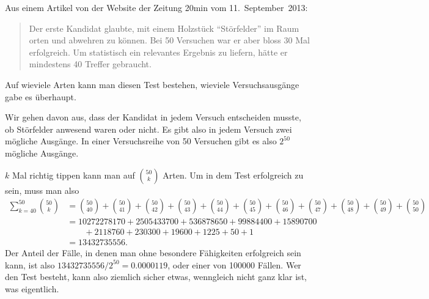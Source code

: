Aus einem Artikel von der Website der Zeitung 20min vom 11.~September~2013:
\begin{quotation}
Der erste Kandidat glaubte, mit einem Holzstück ``Störfelder'' im Raum
orten und abwehren zu können.
Bei 50 Versuchen war er aber bloss 30 Mal erfolgreich. Um statistisch
ein relevantes Ergebnis zu liefern, hätte er mindestens 40 Treffer gebraucht.
\end{quotation}
Auf wieviele Arten kann man diesen Test bestehen, wieviele Versuchsausgänge
gabe es überhaupt.


\begin{loesung}
Wir gehen davon aus, dass der Kandidat in jedem Versuch entscheiden musste,
ob Störfelder anwesend waren oder nicht. Es gibt also in jedem Versuch
zwei mögliche Ausgänge. In einer Versuchsreihe von 50 Versuchen gibt
es also $2^{50}$ mögliche Ausgänge.

$k$ Mal richtig tippen kann man auf
$\binom{50}{k}$ Arten. Um in dem Test erfolgreich zu sein, muss man also
\begin{align*}
\sum_{k=40}^{50}\binom{50}{k}
&=
\binom{50}{40}
+
\binom{50}{41}
+
\binom{50}{42}
+
\binom{50}{43}
+
\binom{50}{44}
+
\binom{50}{45}
+
\binom{50}{46}
+
\binom{50}{47}
+
\binom{50}{48}
+
\binom{50}{49}
+
\binom{50}{50}
\\
&=
10272278170
+
2505433700
+
536878650
+
99884400
+
15890700
\\
&\qquad+
2118760
+
230300
+
19600
+
1225
+
50
+
1
\\
&=13432735556.
\end{align*}
Der Anteil der Fälle, in denen man ohne besondere Fähigkeiten 
erfolgreich sein kann, ist also $13432735556/2^{50}=0.0000119$,
oder einer von 100000 Fällen. Wer den Test besteht, kann also ziemlich
sicher etwas, wenngleich nicht ganz klar ist, was eigentlich.
\end{loesung}
